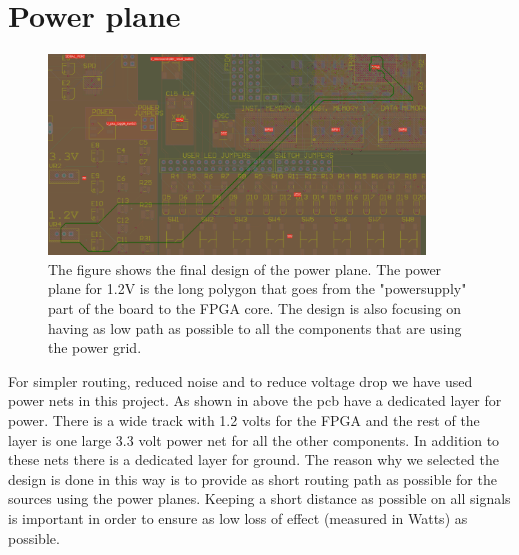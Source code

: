\section {Power plane}

\begin{figure}
\centering
\includegraphics[width=10cm,keepaspectratio]{pcb/powerplanephoto.png}
\caption{The figure shows the final design of the power plane. The power plane for 1.2V is the long polygon that goes from the "powersupply" part of the board to the FPGA core. The
design is also focusing on having as low path as possible to all the components that are using the power grid.  }
\label{figure:powerplanephoto}
\end{figure}

For simpler routing, reduced noise and to reduce voltage drop we have used power nets in this project.
As shown in above the pcb have a dedicated layer for power.
There is a wide track with 1.2 volts for the FPGA and the rest of the layer is one large 3.3 volt power net for all the other components.
In addition to these nets there is a dedicated layer for ground. The reason why we selected the design is done in this way is to provide as short routing path as possible for the sources using the power planes.
Keeping a short distance as possible on all signals is important in order to ensure as low loss of effect (measured in Watts) as possible.

